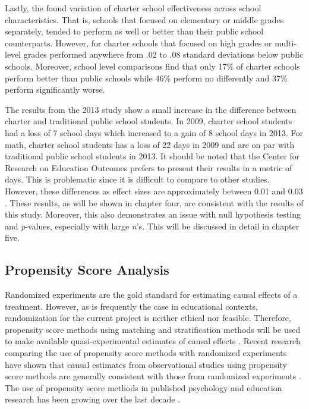 \documentclass[letterpaper,12p,twoside]{article} %
\begin{document}
Lastly, the  found variation of charter school effectiveness across school characteristics. That is, schools that focused on elementary or middle grades separately, tended to perform as well or better than their public school counterparts. However, for charter schools that focused on high grades or multi-level grades performed anywhere from .02 to .08 standard deviations below public schools. Moreover, school level comparisons find that only 17\% of charter schools perform better than public schools while 46\% perform no differently and 37\% perform significantly worse.

The results from the 2013 study \cite{credo2013} show a small increase in the difference between charter and traditional public school students. In 2009, charter school students had a loss of 7 school days which increased to a gain of 8 school days in 2013. For math, charter school students has a loss of 22 days in 2009 and are on par with traditional public school students in 2013. It should be noted that the Center for Research on Education Outcomes prefers to present their results in a metric of days. This is problematic since it is difficult to compare to other studies. However, these differences as effect sizes are approximately between 0.01 and 0.03 \cite{Loveless2013}. These results, as will be shown in chapter four, are consistent with the results of this study. Moreover, this also demonstrates an issue with null hypothesis testing and \textit{p}-values, especially with large \textit{n}'s. This will be discussed in detail in chapter five.


\subsection{Propensity Score Analysis}

Randomized experiments are the gold standard for estimating causal effects of a treatment. However, as is frequently the case in educational contexts, randomization for the current project is neither ethical nor feasible. Therefore, propensity score methods \cite{RosenbaumRubin1983} using matching \cite{StuartRubin2008,Stuart2010} and stratification methods \cite{RaudenbushHongRowan2003} will be used to make available quasi-experimental estimates of causal effects \cite<see also>{SchneiderEtAl2007,StuartRubin2008}. Recent research comparing the use of propensity score methods with randomized experiments have shown that causal estimates from observational studies using propensity score methods are generally consistent with those from randomized experiments \cite{CookShadishWong2008,ShadishClarkSteiner2008}. The use of propensity score methods in published psychology and education research has been growing over the last decade \cite{ThoemmesKim2011}.
\end{document}

